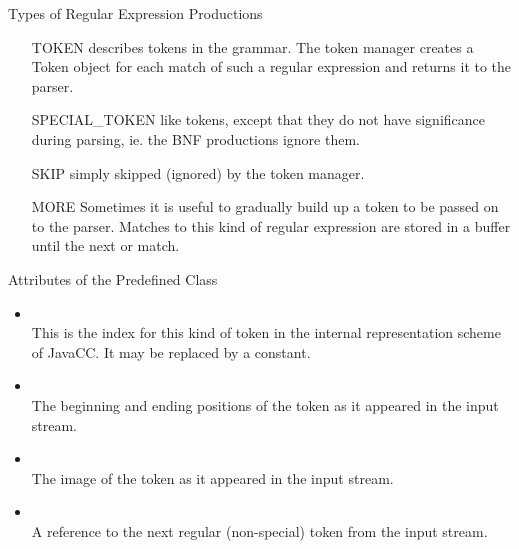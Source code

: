 \begin{bibunit}[apalike]
\begin{frame}{Types of Regular Expression Productions }
	\begin{enumerate}
	\item[TOKEN] describes tokens in the grammar. The token manager creates a Token object for each match of such a regular expression and returns it to the parser.
	\vfill
	\item[SPECIAL\_TOKEN] like tokens, except that they do not have significance during parsing, ie. the BNF productions ignore them.
	\vfill
	\item[SKIP] simply skipped (ignored) by the token manager.
	\vfill
	\item[MORE] Sometimes it is useful to gradually build up a token to be passed on to the parser. Matches to this kind of regular expression are stored in a buffer until the next  or  match.
	\end{enumerate}
\end{frame}

\begin{frame}{Attributes of the Predefined  Class}
	\begin{itemize}
	\item {} \\
		This is the index for this kind of token in the internal representation scheme of JavaCC. It may be replaced by a constant.
	\vfill
	\item {} \\
		The beginning and ending positions of the token as it appeared in the input stream.
	\vfill
	\item {} \\
		The image of the token as it appeared in the input stream.
	\vfill
	\item {} \\
		A reference to the next regular (non-special) token from the input stream.
	\end{itemize}
\end{frame}


\end{bibunit}
